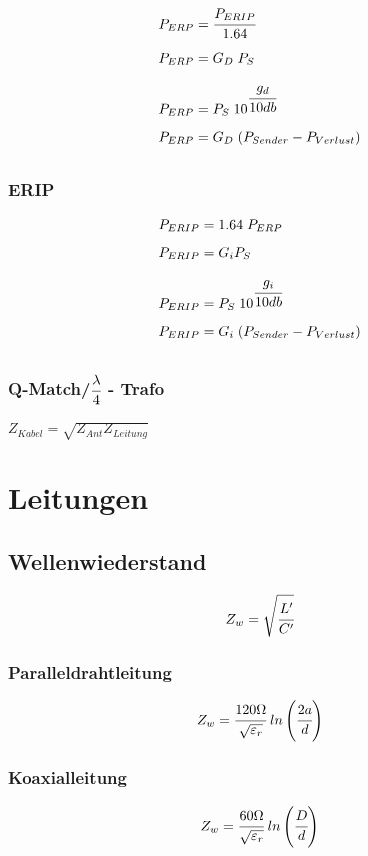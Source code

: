 \documentclass[12pt,a5paper,ngerman,titlepage]{article}
\begin{document}
\begin{align*}
&P_{ERP} = \cfrac{P_{ERIP}}{1.64} \\[5pt]
&P_{ERP} = G_{D}\;P_{S} \\[5pt]
&P_{ERP} = P_{S} \; 10^{\cfrac{g_{d}}{10db}}  \\[5pt]
&P_{ERP} = G_{D}\; (P_{Sender}- P_{Verlust}) \\[5pt]
\end{align*}

\subsubsection{ERIP}

\begin{align*}
&P_{ERIP} = 1.64 \; P_{ERP}  \\[5pt]
&P_{ERIP} = G_{i}P_{S} \\[5pt]
&P_{ERIP} = P_{S} \; 10^{\cfrac{g_{i}}{10db}}  \\[5pt]
&P_{ERIP} = G_{i}\; (P_{Sender}- P_{Verlust}) \\[5pt]
\end{align*}

\subsubsection{Q-Match/$\cfrac{\lambda}{4}$ \;- Trafo}
$Z_{Kabel}=\sqrt{Z_{Ant}Z_{Leitung}}$

\newpage
\section{Leitungen}

\subsection{Wellenwiederstand}

$$Z_{w} = \sqrt{\cfrac{L'}{C'}}$$

\subsubsection{Paralleldrahtleitung}

$$Z_{w} = \cfrac{120\Omega}{\sqrt{\varepsilon_{r}}} \; ln\left(\cfrac{2a}{d}\right)$$

\subsubsection{Koaxialleitung}
$$Z_{w} = \cfrac{60\Omega}{\sqrt{\varepsilon_{r}}} \; ln\left(\cfrac{D}{d}\right)$$
\end{document}
